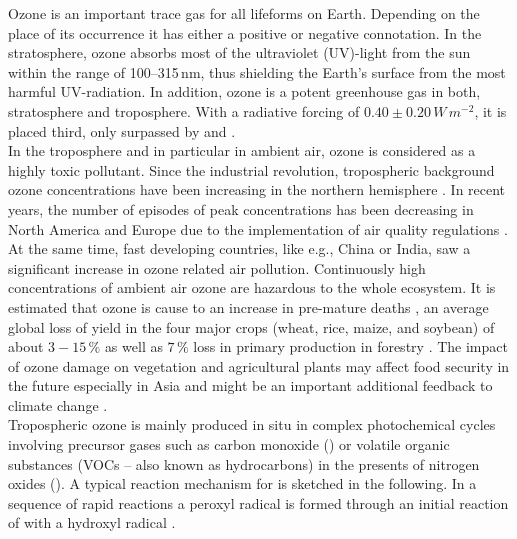 \documentclass[gmd, manuscript]{copernicus}
\begin{document}
\introduction  %
Ozone is an important trace gas for all lifeforms on Earth. Depending on the place of its occurrence it has either a positive or negative connotation. In the stratosphere, ozone absorbs most of the ultraviolet (UV)-light from the sun within the range of 100--315\,\unit{nm}, thus shielding the Earth's surface from the most harmful UV-radiation. In addition, ozone is a potent greenhouse gas in both, stratosphere and troposphere. With a radiative forcing of $0.40 \pm 0.20\,\unit{W\,m^{-2}}$, it is placed third, only surpassed by  and  \citep[Chapter 8]{IPCC2013}.\\
In the troposphere and in particular in ambient air, ozone is considered as a highly toxic pollutant. Since the industrial revolution, tropospheric background ozone concentrations have been increasing in the northern hemisphere \citep[Chapter 2]{IPCC2013}. In recent years, the number of episodes of peak concentrations has been decreasing in North America and Europe due to the implementation of air quality regulations \citep[e.g.,][]{ACP:Wilson2012}. At the same time, fast developing countries, like e.g., China or India, saw a significant increase in ozone related air pollution. Continuously high concentrations of ambient air ozone are hazardous to the whole ecosystem. It is estimated that ozone is cause to an increase in pre-mature deaths \citep{WHO2008}, an average global loss of yield in the four major crops (wheat, rice, maize, and soybean) of about $3-15\,\unit{\%}$ \citep{PJ:Ainsworth2017} as well as $7\,\unit{\%}$ loss in primary production in forestry \citep{GCB:Wittig2009,EP:Matyssek2012}. The impact of ozone damage on vegetation and agricultural plants may affect food security in the future especially in Asia \citep{GCB:Tang2013,NCC:Tai2014,AE:Chuwah2015} and might be an important additional feedback to climate change \citep{Nat:Sitch2007}.\\
Tropospheric ozone is mainly produced in situ in complex photochemical cycles involving precursor gases such as carbon monoxide () or volatile organic substances (VOCs -- also known as hydrocarbons) in the presents of nitrogen oxides (). A typical reaction mechanism for  is sketched in the following. In a sequence of rapid reactions a peroxyl radical  is formed through an initial reaction of  with a hydroxyl radical .
\end{document}
